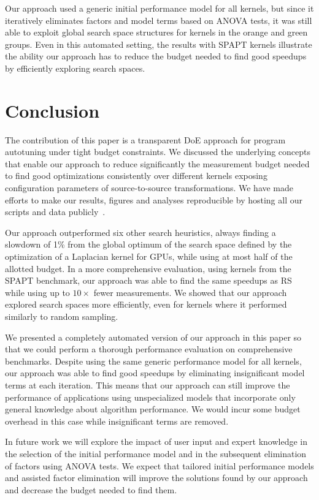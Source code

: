 \documentclass[conference]{IEEEtran}
\begin{document}
Our approach used a generic initial performance model for all kernels, but since
it iteratively eliminates factors and model terms based on ANOVA tests, it was
still able to exploit global search space structures for kernels in the orange
and green groups. Even in this automated setting, the results with SPAPT kernels
illustrate the ability our approach has to reduce the budget needed to find good
speedups by efficiently exploring search spaces.
\section{Conclusion}
\label{sec:org2723a63}
The contribution of this paper is a transparent DoE approach for program
autotuning under tight budget constraints. We discussed the underlying concepts
that enable our approach to reduce significantly the measurement budget needed
to find good optimizations consistently over different kernels exposing
configuration parameters of source-to-source transformations. We have made
efforts to make our results, figures and analyses reproducible by hosting all
our scripts and data publicly~\cite{bruel2018ccgrid19}.

Our approach outperformed six other search heuristics, always finding a slowdown
of 1\% from the global optimum of the search space defined by the optimization of
a Laplacian kernel for GPUs, while using at most half of the allotted budget. In
a more comprehensive evaluation, using kernels from the SPAPT benchmark, our
approach was able to find the same speedups as RS while using up to \(10\times\)
fewer measurements. We showed that our approach explored search spaces more
efficiently, even for kernels where it performed similarly to random sampling.

We presented a completely automated version of our approach in this paper so
that we could perform a thorough performance evaluation on comprehensive
benchmarks. Despite using the same generic performance model for all kernels,
our approach was able to find good speedups by eliminating insignificant model
terms at each iteration. This means that our approach can still improve the
performance of applications using unspecialized models that incorporate only
general knowledge about algorithm performance. We would incur some budget
overhead in this case while insignificant terms are removed.

In future work we will explore the impact of user input and expert knowledge in
the selection of the initial performance model and in the subsequent elimination
of factors using ANOVA tests. We expect that tailored initial performance models
and assisted factor elimination will improve the solutions found by our approach
and decrease the budget needed to find them.
\end{document}
